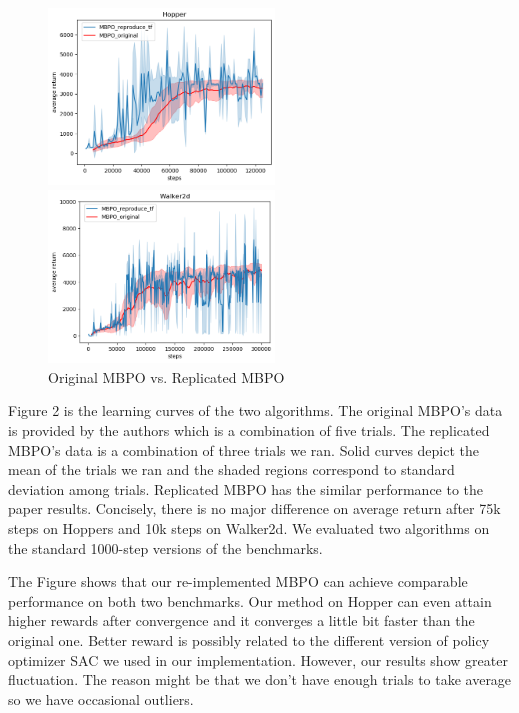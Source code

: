 \documentclass{article}
\begin{document}
\begin{figure}[h]
\centering
\begin{minipage}[t]{0.48\textwidth}
\centering
\includegraphics[width=6cm]{compareToOriginHopper}
\end{minipage}
\begin{minipage}[t]{0.48\textwidth}
\centering
\includegraphics[width=6cm]{compareToOriginWalker2d}
\end{minipage}
\caption{Original MBPO vs. Replicated MBPO}
\end{figure}

Figure 2 is the learning curves of the two algorithms. The original MBPO's data is provided by the authors which is a combination of five trials. The replicated MBPO's data is a combination of three trials we ran. Solid curves depict the mean of the trials we ran and the shaded regions correspond to standard deviation among trials. Replicated MBPO has the similar performance to the paper results. Concisely, there is no major difference on average return after 75k steps on Hoppers and 10k steps on Walker2d. We evaluated two algorithms on the standard 1000-step versions of the benchmarks.

The Figure shows that our re-implemented MBPO can achieve comparable performance on both two benchmarks. Our method on Hopper can even attain higher rewards after convergence and it converges a little bit faster than the original one. Better reward is possibly related to the different version of policy optimizer SAC we used in our implementation. However, our results show greater fluctuation. The reason might be that we don't have enough  trials to take average so we have occasional outliers. 
\end{document}
